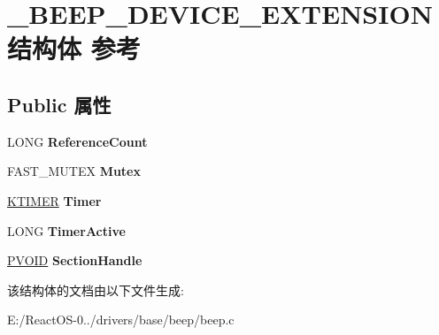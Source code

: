 \hypertarget{struct___b_e_e_p___d_e_v_i_c_e___e_x_t_e_n_s_i_o_n}{}\section{\+\_\+\+B\+E\+E\+P\+\_\+\+D\+E\+V\+I\+C\+E\+\_\+\+E\+X\+T\+E\+N\+S\+I\+O\+N结构体 参考}
\label{struct___b_e_e_p___d_e_v_i_c_e___e_x_t_e_n_s_i_o_n}
\subsection*{Public 属性}
\begin{DoxyCompactItemize}
\item 
\mbox{\label{struct___b_e_e_p___d_e_v_i_c_e___e_x_t_e_n_s_i_o_n_a3060e4943cd78a605df574deb1097d99}} 
L\+O\+NG {\bfseries Reference\+Count}
\item 
\mbox{\label{struct___b_e_e_p___d_e_v_i_c_e___e_x_t_e_n_s_i_o_n_a0a54a9d5f2f0db78b499c44fdf464899}} 
F\+A\+S\+T\+\_\+\+M\+U\+T\+EX {\bfseries Mutex}
\item 
\mbox{\label{struct___b_e_e_p___d_e_v_i_c_e___e_x_t_e_n_s_i_o_n_ab41b3508381f9841657f4aab48b317e4}} 
\hyperlink{struct___k_t_i_m_e_r}{K\+T\+I\+M\+ER} {\bfseries Timer}
\item 
\mbox{\label{struct___b_e_e_p___d_e_v_i_c_e___e_x_t_e_n_s_i_o_n_a758424576031569dc527dc78170c3d3a}} 
L\+O\+NG {\bfseries Timer\+Active}
\item 
\mbox{\label{struct___b_e_e_p___d_e_v_i_c_e___e_x_t_e_n_s_i_o_n_ab7e3e8016e93ada58e4af520ddd6dda4}} 
\hyperlink{interfacevoid}{P\+V\+O\+ID} {\bfseries Section\+Handle}
\end{DoxyCompactItemize}


该结构体的文档由以下文件生成\+:\begin{DoxyCompactItemize}
\item 
E\+:/\+React\+O\+S-\/0../drivers/base/beep/beep.\+c\end{DoxyCompactItemize}
